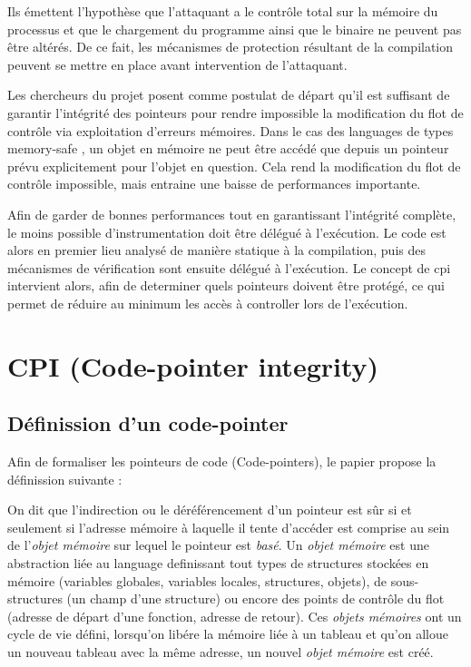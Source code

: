 Ils émettent l'hypothèse que l'attaquant a le contrôle total sur la mémoire du processus et que le chargement du programme ainsi que le binaire ne peuvent pas être altérés. De ce fait, les mécanismes de protection résultant de la compilation peuvent se mettre en place avant intervention de l'attaquant.

Les chercheurs du projet posent comme postulat de départ qu'il est suffisant de garantir l'intégrité des pointeurs pour rendre impossible la modification du flot de contrôle via exploitation d'erreurs mémoires. Dans le cas des languages de types \og memory-safe \fg, un objet en mémoire ne peut être accédé que depuis un pointeur prévu explicitement pour l'objet en question. Cela rend la modification du flot de contrôle impossible, mais entraine une baisse de performances importante.

Afin de garder de bonnes performances tout en garantissant l'intégrité complète, le moins possible d'instrumentation doit être délégué à l'exécution. Le code est alors en premier lieu analysé de manière statique à la compilation, puis des mécanismes de vérification sont ensuite délégué à l'exécution. Le concept de \gls{cpi} \cite{CPIPaper} intervient alors, afin de determiner quels pointeurs doivent être protégé, ce qui permet de réduire au minimum les accès à controller lors de l'exécution.

\section{CPI (Code-pointer integrity)}


\subsection{Définission d'un code-pointer}

Afin de formaliser les pointeurs de code (Code-pointers), le papier propose la définission suivante :

On dit que l'indirection ou le déréférencement d'un pointeur est sûr si et seulement si l'adresse mémoire à laquelle il tente d'accéder est comprise au sein de l'\textit{objet mémoire} sur lequel le pointeur est \textit{basé}. Un \textit{objet mémoire} est une abstraction liée au language definissant tout types de structures stockées en mémoire (variables globales, variables locales, structures, objets), de sous-structures (un champ d'une structure) ou encore des points de contrôle du flot (adresse de départ d'une fonction, adresse de retour). Ces \textit{objets mémoires} ont un cycle de vie défini, lorsqu'on libére la mémoire liée à un tableau et qu'on alloue un nouveau tableau avec la même adresse, un nouvel \textit{objet mémoire} est créé.

